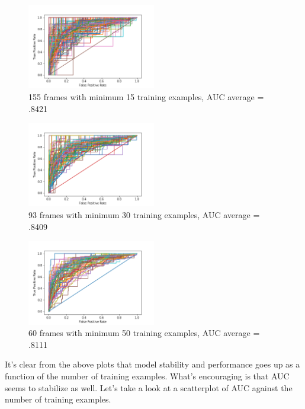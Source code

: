 \documentclass[11pt,a4paper]{article}
\begin{document}
\begin{figure}
	\centering
	\includegraphics[width=0.5\textwidth]{auc_plot15.png}
	\caption{\label{fig:frog} 155 frames with minimum 15 training examples, AUC average = .8421}
\end{figure}

\begin{figure}
	\centering
	\includegraphics[width=0.5\textwidth]{auc_plot30.png}
	\caption{\label{fig:frog} 93 frames with minimum 30 training examples, AUC average = .8409}
\end{figure}

\begin{figure}
	\centering
	\includegraphics[width=0.5\textwidth]{auc_plot50.png}
	\caption{\label{fig:frog} 60 frames with minimum 50 training examples, AUC average = .8111}
\end{figure}

It's clear from the above plots that model stability and performance goes up as a function of the number of training examples. What's encouraging is that AUC seems to stabilize as well. Let's take a look at a scatterplot of AUC against the number of training examples.
\end{document}
